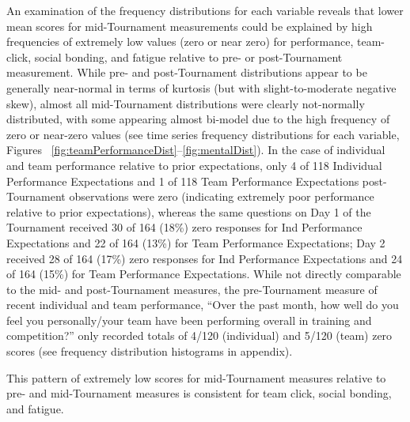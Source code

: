 \documentclass[12pt]{report}
\begin{document}
{An examination of the frequency distributions for each variable reveals that lower mean scores for mid-Tournament measurements could be explained by high frequencies of extremely low values (zero or near zero) for performance, team-click, social bonding, and fatigue relative to pre- or post-Tournament measurement.  While pre- and post-Tournament distributions appear to be generally near-normal in terms of kurtosis (but with slight-to-moderate negative skew), almost all mid-Tournament distributions were clearly not-normally distributed, with some appearing almost bi-model due to the high frequency of zero or near-zero values (see time series frequency distributions for each variable, Figures ~\ref{fig:teamPerformanceDist}\nobreakdash--\ref{fig:mentalDist}).  In the case of individual and team performance relative to prior expectations, only 4 of 118 Individual Performance Expectations and 1 of 118 Team Performance Expectations post-Tournament observations were zero (indicating extremely poor performance relative to prior expectations), whereas the same questions on Day 1 of the Tournament received 30 of 164 (18\%) zero responses for Ind Performance Expectations and 22 of 164 (13\%) for Team Performance Expectations; Day 2 received 28 of 164 (17\%) zero responses for Ind Performance Expectations and 24 of 164 (15\%) for Team Performance Expectations.  While not directly comparable to the mid- and post-Tournament measures, the pre-Tournament measure of recent individual and team performance, ``Over the past month, how well do you feel you personally/your team have been performing overall in training and competition?'' only recorded totals of 4/120 (individual) and 5/120 (team) zero scores (see frequency distribution histograms in appendix).

This pattern of extremely low scores for mid-Tournament measures relative to pre- and mid-Tournament measures is consistent for team click, social bonding, and fatigue.

}
\end{document}
